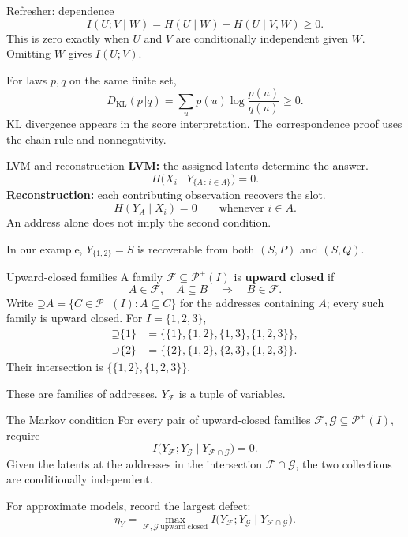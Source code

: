 \documentclass[aspectratio=169,12pt]{beamer}
\newcommand{\PI}{\mathcal P^+(I)}
\newcommand{\Up}{\mathord{\supseteq}}
\begin{document}
\begin{frame}{Refresher: dependence}
\[
I(U;V\mid W)=H(U\mid W)-H(U\mid V,W)\ge0.
\]
This is zero exactly when $U$ and $V$ are conditionally independent given $W$.
Omitting $W$ gives $I(U;V)$.
\medskip

For laws $p,q$ on the same finite set,
\[
D_{\mathrm{KL}}(p\Vert q)=\sum_u p(u)\log\frac{p(u)}{q(u)}\ge0.
\]
KL divergence appears in the score interpretation. The correspondence proof
uses the chain rule and nonnegativity.
\end{frame}

\begin{frame}{LVM and reconstruction}
\textbf{LVM:} the assigned latents determine the answer.
\[
H\bigl(X_i\mid Y_{\{A\,:\,i\in A\}}\bigr)=0.
\]
\textbf{Reconstruction:} each contributing observation recovers the slot.
\[
H(Y_A\mid X_i)=0\qquad\text{whenever }i\in A.
\]
An address alone does not imply the second condition.
\medskip

In our example, $Y_{\{1,2\}}=S$ is recoverable from both $(S,P)$ and $(S,Q)$.
\end{frame}

\begin{frame}{Upward-closed families}
A family $\mathcal F\subseteq\PI$ is \textbf{upward closed} if
\[
A\in\mathcal F,\quad A\subseteq B
\quad\Longrightarrow\quad B\in\mathcal F.
\]
Write $\Up A=\{C\in\PI:A\subseteq C\}$ for the addresses containing $A$; every
such family is upward closed. For $I=\{1,2,3\}$,
\[
\begin{aligned}
\Up\{1\}&=\{\{1\},\{1,2\},\{1,3\},\{1,2,3\}\},\\
\Up\{2\}&=\{\{2\},\{1,2\},\{2,3\},\{1,2,3\}\}.
\end{aligned}
\]
Their intersection is $\{\{1,2\},\{1,2,3\}\}$.
\medskip

These are families of addresses. $Y_{\mathcal F}$ is a tuple of variables.
\end{frame}

\begin{frame}{The Markov condition}
For every pair of upward-closed families $\mathcal F,\mathcal G\subseteq\PI$, require
\[
I\bigl(Y_{\mathcal F};Y_{\mathcal G}
\mid Y_{\mathcal F\cap\mathcal G}\bigr)=0.
\]
Given the latents at the addresses in the intersection $\mathcal F\cap\mathcal G$,
the two collections are conditionally independent.
\medskip

For approximate models, record the largest defect:
\[
\eta_Y=\max_{\mathcal F,\mathcal G\ \mathrm{upward\ closed}}
I\bigl(Y_{\mathcal F};Y_{\mathcal G}
\mid Y_{\mathcal F\cap\mathcal G}\bigr).
\]
\end{frame}
\end{document}
